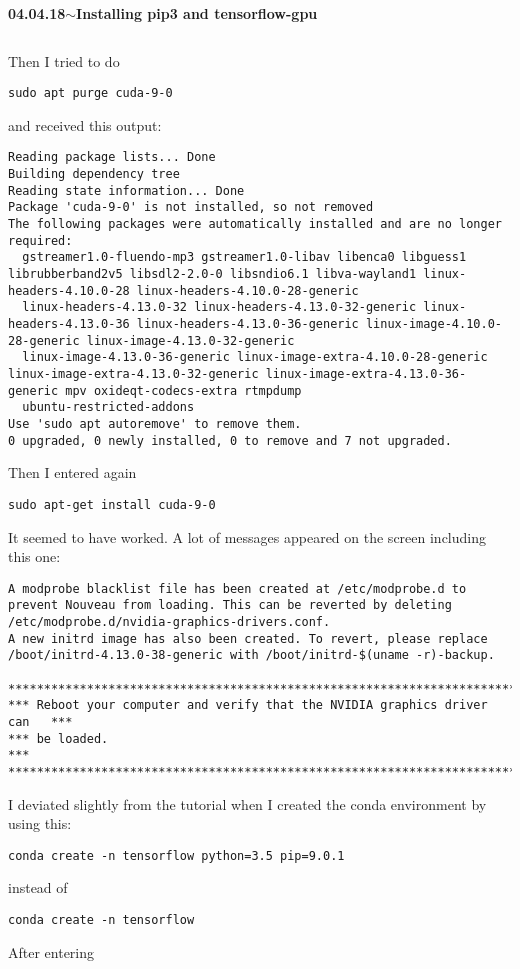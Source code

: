 \documentclass[11pt,a4paper]{article}
\newenvironment{loggentry}[2]%
{\noindent\textbf{#1}\hspace{1cm}$\mathbf{\sim}$\text{ }\textbf{#2}\\}{\vspace{0.5cm}}
\begin{document}
\begin{loggentry}{04.04.18}{Installing pip3 and tensorflow-gpu}
\begin{verbatim}
\end{verbatim}
Then I tried to do
\begin{verbatim}
sudo apt purge cuda-9-0
\end{verbatim}
and received this output:
\begin{verbatim}
Reading package lists... Done
Building dependency tree       
Reading state information... Done
Package 'cuda-9-0' is not installed, so not removed
The following packages were automatically installed and are no longer required:
  gstreamer1.0-fluendo-mp3 gstreamer1.0-libav libenca0 libguess1 librubberband2v5 libsdl2-2.0-0 libsndio6.1 libva-wayland1 linux-headers-4.10.0-28 linux-headers-4.10.0-28-generic
  linux-headers-4.13.0-32 linux-headers-4.13.0-32-generic linux-headers-4.13.0-36 linux-headers-4.13.0-36-generic linux-image-4.10.0-28-generic linux-image-4.13.0-32-generic
  linux-image-4.13.0-36-generic linux-image-extra-4.10.0-28-generic linux-image-extra-4.13.0-32-generic linux-image-extra-4.13.0-36-generic mpv oxideqt-codecs-extra rtmpdump
  ubuntu-restricted-addons
Use 'sudo apt autoremove' to remove them.
0 upgraded, 0 newly installed, 0 to remove and 7 not upgraded.
\end{verbatim}
Then I entered again
\begin{verbatim}
sudo apt-get install cuda-9-0
\end{verbatim}
It seemed to have worked. A lot of messages appeared on the screen including this one:
\begin{verbatim}
A modprobe blacklist file has been created at /etc/modprobe.d to prevent Nouveau from loading. This can be reverted by deleting /etc/modprobe.d/nvidia-graphics-drivers.conf.
A new initrd image has also been created. To revert, please replace /boot/initrd-4.13.0-38-generic with /boot/initrd-$(uname -r)-backup.

*****************************************************************************
*** Reboot your computer and verify that the NVIDIA graphics driver can   ***
*** be loaded.                                                            ***
*****************************************************************************
\end{verbatim}
I deviated slightly from the tutorial when I created the conda environment by using this:\\
\begin{verbatim}
conda create -n tensorflow python=3.5 pip=9.0.1
\end{verbatim}
instead
of
\begin{verbatim}
conda create -n tensorflow
\end{verbatim}
After entering


\end{loggentry}
\end{document}
